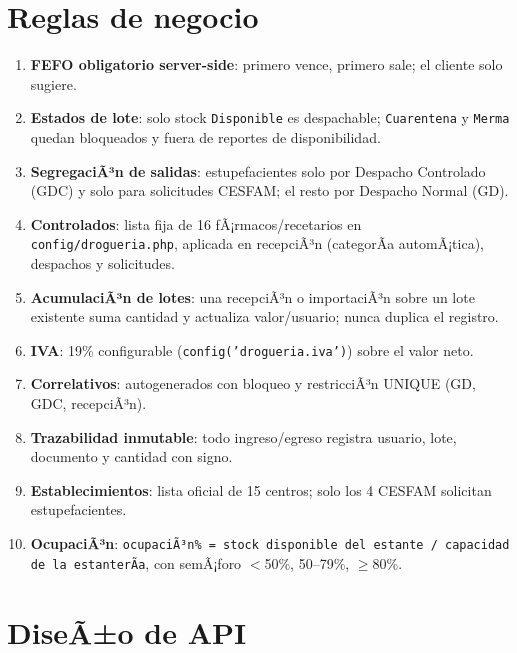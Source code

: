 ﻿\documentclass[a4paper, 12pt]{article}
\begin{document}
\section{Reglas de negocio}
\begin{enumerate}
    \item \textbf{FEFO obligatorio server-side}: primero vence, primero sale; el cliente solo sugiere.
    \item \textbf{Estados de lote}: solo stock \texttt{Disponible} es despachable; \texttt{Cuarentena} y \texttt{Merma} quedan bloqueados y fuera de reportes de disponibilidad.
    \item \textbf{SegregaciÃ³n de salidas}: estupefacientes solo por Despacho Controlado (GDC) y solo para solicitudes CESFAM; el resto por Despacho Normal (GD).
    \item \textbf{Controlados}: lista fija de 16 fÃ¡rmacos/recetarios en \texttt{config/drogueria.php}, aplicada en recepciÃ³n (categorÃ­a automÃ¡tica), despachos y solicitudes.
    \item \textbf{AcumulaciÃ³n de lotes}: una recepciÃ³n o importaciÃ³n sobre un lote existente suma cantidad y actualiza valor/usuario; nunca duplica el registro.
    \item \textbf{IVA}: 19\% configurable (\texttt{config('drogueria.iva')}) sobre el valor neto.
    \item \textbf{Correlativos}: autogenerados con bloqueo y restricciÃ³n UNIQUE (GD, GDC, recepciÃ³n).
    \item \textbf{Trazabilidad inmutable}: todo ingreso/egreso registra usuario, lote, documento y cantidad con signo.
    \item \textbf{Establecimientos}: lista oficial de 15 centros; solo los 4 CESFAM solicitan estupefacientes.
    \item \textbf{OcupaciÃ³n}: \texttt{ocupaciÃ³n\% = stock disponible del estante / capacidad de la estanterÃ­a}, con semÃ¡foro $<$50\%, 50--79\%, $\geq$80\%.
\end{enumerate}

\section{DiseÃ±o de API}
\end{document}
